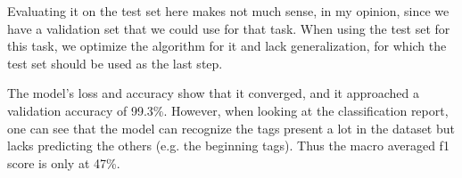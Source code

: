 \documentclass[onecolumn]{article}
\begin{document}
Evaluating it on the test set here makes not much sense, in my opinion, since we have a validation set that we could use for that task. When using the test set for this task, we optimize the algorithm for it and lack generalization, for which the test set should be used as the last step. 

The model's loss and accuracy show that it converged, and it approached a validation accuracy of 99.3\%. However, when looking at the classification report, one can see that the model can recognize the tags present a lot in the dataset but lacks predicting the others (e.g. the beginning tags). Thus the macro averaged f1 score is only at 47\%.
\end{document}
